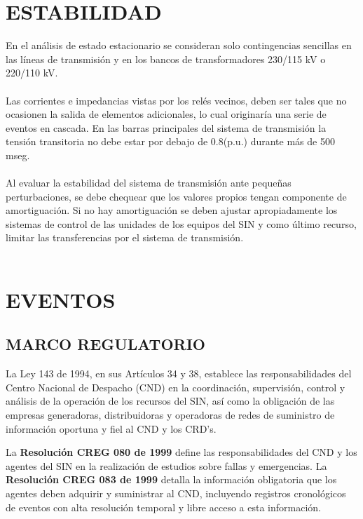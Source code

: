 \documentclass[a5paper]{book}%
\begin{document}
\chapter{ESTABILIDAD}
 En el análisis de estado estacionario se consideran solo
  contingencias sencillas en las líneas de transmisión y en los bancos
  de transformadores 230/115 kV o 220/110 kV.\\\\
	
	
 Las corrientes e impedancias vistas por los relés vecinos, deben
  ser tales que no ocasionen la salida de elementos adicionales, lo
  cual originaría una serie de eventos en cascada.  En las barras
  principales del sistema de transmisión la tensión transitoria no
  debe estar por debajo de 0.8(p.u.) durante más de 500 mseg.\\\\
	
 Al evaluar la estabilidad del sistema de transmisión ante
  pequeñas perturbaciones, se debe chequear que los valores propios
  tengan componente de amortiguación. Si no hay amortiguación se deben
  ajustar apropiadamente los sistemas de control de las unidades de
  los equipos del SIN y como último recurso, limitar las
  transferencias por el sistema de transmisión.\\\\


  \chapter{EVENTOS}

  \section{MARCO REGULATORIO}

\begin{center}
\begin{tcolorbox}
La Ley 143 de 1994, en sus Artículos 34 y 38, establece las responsabilidades del Centro Nacional de Despacho (CND) en la coordinación, supervisión, control y análisis de la operación de los recursos del SIN, así como la obligación de las empresas generadoras, distribuidoras y operadoras de redes de suministro de información oportuna y fiel al CND y los CRD's.
\end{tcolorbox}
\end{center}

  La \textbf{Resolución CREG 080 de 1999} define las responsabilidades del CND y los agentes del SIN en la realización de estudios sobre fallas y emergencias. La \textbf{Resolución CREG 083 de 1999} detalla la información obligatoria que los agentes deben adquirir y suministrar al CND, incluyendo registros cronológicos de eventos con alta resolución temporal y libre acceso a esta información.\\\\ 
  
\end{document}

